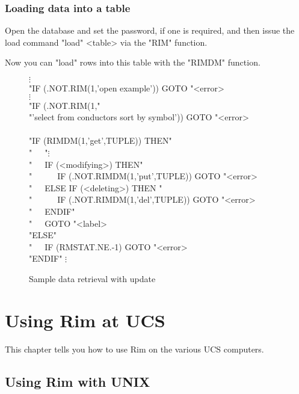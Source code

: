  
\subsection{Loading data into a table}
%
Open the database and set the password, if one is required, and then
issue the load command
\<"load" <table>\>
via the "RIM" function.
 
Now you can "load" rows into this table with the
"RIMDM" function.
 
\begin{figure}
  \let\bf\tt
\<$\vdots$\\
    "IF (.NOT.RIM(1,'open example')) GOTO "<error>\\
    $\vdots$\\
    "IF (.NOT.RIM(1," \\
       "'select from conductors sort by symbol')) GOTO "<error>\\
    \\
    "IF (RIMDM(1,'get',TUPLE)) THEN"  \\
    "~~~"$\vdots$\\
    "~~~IF (<modifying>) THEN"\\
    "~~~~~~IF (.NOT.RIMDM(1,'put',TUPLE)) GOTO "<error>\\
    "~~~ELSE IF (<deleting>) THEN "\\
    "~~~~~~IF (.NOT.RIMDM(1,'del',TUPLE)) GOTO "<error>\\
    "~~~ENDIF"\\
    "~~~GOTO "<label>\\
    "ELSE" \\
    "~~~IF (RMSTAT.NE.-1) GOTO "<error>\\
    "ENDIF"
    $\vdots$\>
\caption{Sample data retrieval with update}
\label{pi-ret}
\end{figure}
 
 
 
 
\appendix
 
\chapter{Using Rim at UCS}
%
\label{UCS-systems}
This chapter tells you how to use Rim on the various UCS
computers.
 
\section{Using Rim with UNIX}
%
 
